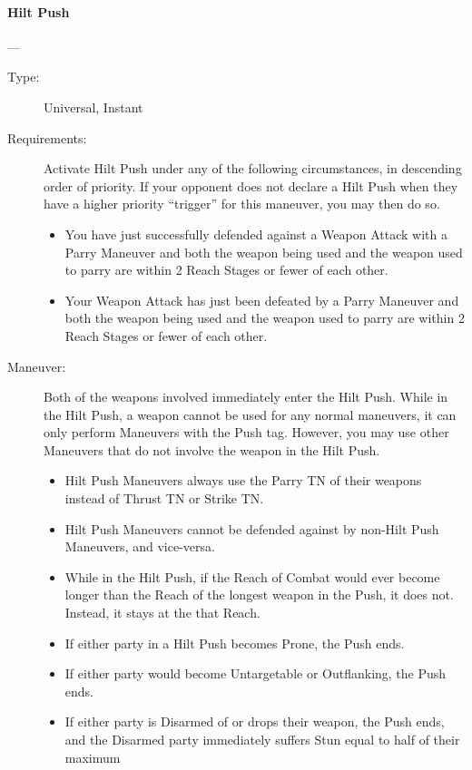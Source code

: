 \documentclass[oneside,11pt,english]{book}
\begin{document}
\paragraph{\large\label{man:Hilt Push}Hilt Push}---\quad{\large[2]}
\vspace{-10pt}\begin{description}
\item [Type:] Universal, Instant 
\item [Requirements:] Activate Hilt Push under any of the following
  circumstances, in descending order of priority. If your opponent does not
  declare a Hilt Push when they have a higher priority “trigger” for this
  maneuver, you may then do so.
  \begin{itemize}
  \item You have just successfully defended against a Weapon Attack with a Parry
    Maneuver and both the weapon being used and the weapon used to parry are
    within 2 Reach Stages or fewer of each other.
  \item Your Weapon Attack has just been defeated by a Parry Maneuver and both
    the weapon being used and the weapon used to parry are within 2 Reach Stages
    or fewer of each other.
  \end{itemize}
\item [Maneuver:] Both of the weapons involved immediately enter the Hilt Push.
  While in the Hilt Push, a weapon cannot be used for any normal maneuvers, it
  can only perform Maneuvers with the Push tag. However, you may use other
  Maneuvers that do not involve the weapon in the Hilt Push.
  \begin{itemize}
  \item Hilt Push Maneuvers always use the Parry TN of their weapons instead of
    Thrust TN or Strike TN.
  \item Hilt Push Maneuvers cannot be defended against by non-Hilt Push
    Maneuvers, and vice-versa.
  \item While in the Hilt Push, if the Reach of Combat would ever become longer
    than the Reach of the longest weapon in the Push, it does not. Instead, it
    stays at the that Reach.
  \item If either party in a Hilt Push becomes Prone, the Push ends. 
  \item If either party would become Untargetable or Outflanking, the Push ends.
  \item If either party is Disarmed of or drops their weapon, the Push ends, and
    the Disarmed party immediately suffers Stun equal to half of their maximum

\end{itemize}
\end{description}
\end{document}
